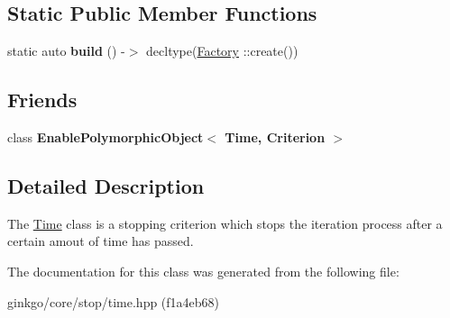 \subsection*{Static Public Member Functions}
\begin{DoxyCompactItemize}
\item 
\mbox{\label{classgko_1_1stop_1_1Time_abe52acfe2a9de19d6b16e36497bac556}} 
static auto {\bfseries build} () -\/$>$ decltype(\hyperlink{classgko_1_1stop_1_1Time_1_1Factory}{Factory} \+::create())
\end{DoxyCompactItemize}
\subsection*{Friends}
\begin{DoxyCompactItemize}
\item 
\mbox{\label{classgko_1_1stop_1_1Time_a0ad01ce3f53eb68b4841ead2a7bf5406}} 
class {\bfseries Enable\+Polymorphic\+Object$<$ Time, Criterion $>$}
\end{DoxyCompactItemize}


\subsection{Detailed Description}
The \hyperlink{classgko_1_1stop_1_1Time}{Time} class is a stopping criterion which stops the iteration process after a certain amout of time has passed. 

The documentation for this class was generated from the following file\+:\begin{DoxyCompactItemize}
\item 
ginkgo/core/stop/time.\+hpp (f1a4eb68)\end{DoxyCompactItemize}
